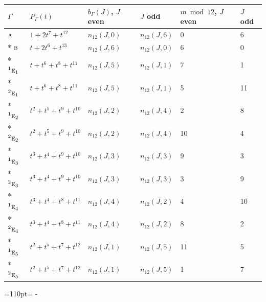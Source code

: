 \documentclass[10pt,a4paper]{article}
\newcommand{\needspace}[1]{\par\penalty-100\begingroup\dimen0=#1\relax\dimen2=\pagegoal
  \advance\dimen2-\pagetotal\ifdim\dimen0>\dimen2\relax\ifdim\dimen2>0pt\vfil\break\fi\fi
  \endgroup}
\numberwithin{equation}{section}
\newcommand{\irr}[1]{\text{\normalfont\scshape #1}}
\newcommand{\conjpair}[1]{{}^{#1}}
\begin{document}
{\small\begin{longtable}{@{}llllll@{}}\toprule
$\Gamma$ & $P_\Gamma(t)$ & $b_\Gamma(J)$, $J$ even & $J$ odd & $m \bmod 12$, $J$ even & $J$ odd\\\midrule\endhead
\bottomrule\endfoot\endlastfoot
$\irr{a}$ & $1 + 2t^{7} + t^{12}$ & $n_{12}(J,0)$ & $n_{12}(J,6)$ & 0 & 6\\*
$\irr{b}$ & $t + 2t^{6} + t^{13}$ & $n_{12}(J,6)$ & $n_{12}(J,0)$ & 6 & 0\\*
$\conjpair{1}\irr{e}_{1}$ & $t + t^{6} + t^{8} + t^{11}$ & $n_{12}(J,5)$ & $n_{12}(J,1)$ & 7 & 1\\*
$\conjpair{2}\irr{e}_{1}$ & $t + t^{6} + t^{8} + t^{11}$ & $n_{12}(J,5)$ & $n_{12}(J,1)$ & 5 & 11\\*
$\conjpair{1}\irr{e}_{2}$ & $t^{2} + t^{5} + t^{9} + t^{10}$ & $n_{12}(J,2)$ & $n_{12}(J,4)$ & 2 & 8\\*
$\conjpair{2}\irr{e}_{2}$ & $t^{2} + t^{5} + t^{9} + t^{10}$ & $n_{12}(J,2)$ & $n_{12}(J,4)$ & 10 & 4\\*
$\conjpair{1}\irr{e}_{3}$ & $t^{3} + t^{4} + t^{9} + t^{10}$ & $n_{12}(J,3)$ & $n_{12}(J,3)$ & 9 & 3\\*
$\conjpair{2}\irr{e}_{3}$ & $t^{3} + t^{4} + t^{9} + t^{10}$ & $n_{12}(J,3)$ & $n_{12}(J,3)$ & 3 & 9\\*
$\conjpair{1}\irr{e}_{4}$ & $t^{3} + t^{4} + t^{8} + t^{11}$ & $n_{12}(J,4)$ & $n_{12}(J,2)$ & 4 & 10\\*
$\conjpair{2}\irr{e}_{4}$ & $t^{3} + t^{4} + t^{8} + t^{11}$ & $n_{12}(J,4)$ & $n_{12}(J,2)$ & 8 & 2\\*
$\conjpair{1}\irr{e}_{5}$ & $t^{2} + t^{5} + t^{7} + t^{12}$ & $n_{12}(J,1)$ & $n_{12}(J,5)$ & 11 & 5\\*
$\conjpair{2}\irr{e}_{5}$ & $t^{2} + t^{5} + t^{7} + t^{12}$ & $n_{12}(J,1)$ & $n_{12}(J,5)$ & 1 & 7\\
\bottomrule\end{longtable}}
\needspace{110pt}
\end{document}
